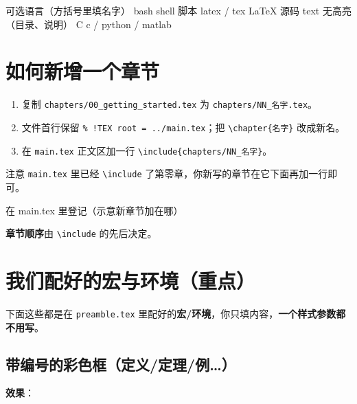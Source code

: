 \begin{codebox}[text]{可选语言（方括号里填名字）}
bash              shell 脚本
latex / tex       LaTeX 源码
text              无高亮（目录、说明）
C  c / python / matlab
\end{codebox}

\section{如何新增一个章节}

\begin{enumerate}
  \item 复制 \texttt{chapters/00\_getting\_started.tex} 为 \texttt{chapters/NN\_名字.tex}。
  \item 文件首行保留 \texttt{\% !TEX root = ../main.tex}；把 \texttt{\textbackslash chapter\{名字\}} 改成新名。
  \item 在 \texttt{main.tex} 正文区加一行 \texttt{\textbackslash include\{chapters/NN\_名字\}}。
\end{enumerate}

注意 \texttt{main.tex} 里已经 \texttt{\textbackslash include} 了第零章，你新写的章节在它下面再加一行即可。


\begin{codebox}[latex]{在 main.tex 里登记（示意新章节加在哪）}
\mainmatter
\end{codebox}

\textbf{章节顺序}由 \texttt{\textbackslash include} 的先后决定。

\section{我们配好的宏与环境（重点）}

下面这些都是在 \texttt{preamble.tex} 里配好的\textbf{宏/环境}，你只填内容，\textbf{一个样式参数都不用写}。

\subsection{带编号的彩色框（定义/定理/例…）}

\textbf{效果}：

